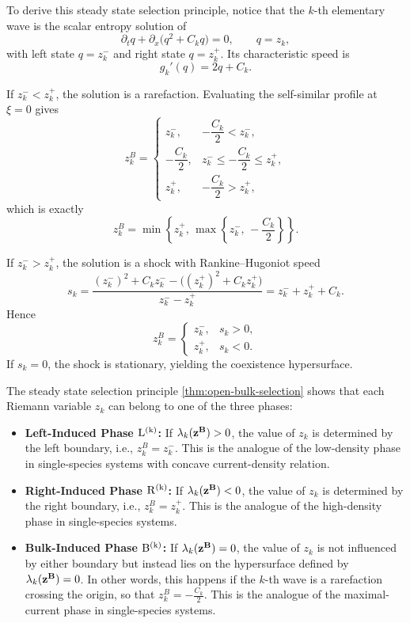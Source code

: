 \documentclass[12pt]{article}
\begin{document}
%
To derive this steady state selection principle, notice that
the $k$-th elementary wave is the scalar entropy solution of
\[
\partial_t q+\partial_x\bigl(q^2+C_k q\bigr)=0,
\qquad q=z_k,
\]
with left state $q=z_k^-$ and right state $q=z_k^+$. Its characteristic
speed is
\[
g_k'(q)=2q+C_k.
\]

If $z_k^-<z_k^+$, the solution is a rarefaction. Evaluating the
self-similar profile at $\xi=0$ gives
\[
z_k^B=
\begin{cases}
z_k^-, & -\dfrac{C_k}{2}<z_k^-,\\[2mm]
-\dfrac{C_k}{2}, & z_k^-\le -\dfrac{C_k}{2}\le z_k^+,\\[3mm]
z_k^+, & -\dfrac{C_k}{2}>z_k^+,
\end{cases}
\]
which is exactly
\[
z_k^B=\min\!\left\{ z_k^+,\, \max\!\left\{ z_k^-,\, -\dfrac{C_k}{2} \right\} \right\}.
\]

If $z_k^->z_k^+$, the solution is a shock with Rankine--Hugoniot speed
\[
s_k=\frac{(z_k^-)^2+C_k z_k^--\bigl((z_k^+)^2+C_k z_k^+\bigr)}{z_k^- - z_k^+}
=z_k^-+z_k^+ + C_k.
\]
Hence
\[
z_k^B=
\begin{cases}
z_k^-, & s_k>0,\\[1mm]
z_k^+, & s_k<0.
\end{cases}
\]
If $s_k=0$, the shock is stationary, yielding the coexistence
hypersurface.


The steady state selection principle \eqref{thm:open-bulk-selection} shows that each Riemann variable
$z_k$ can belong to one of the three phases:
\begin{itemize}
    \item \textbf{Left-Induced Phase  $\rm L^{(k)}$:} If \( \lambda_k({\bf z^B}) > 0 \), the value of \( z_k \) is determined by the left boundary, i.e., \( z_k^B = z_k^{-} \). This is the analogue of the low-density phase in single-species systems with
concave current-density relation.

    \item \textbf{Right-Induced Phase $ \rm R^{(k)}$: } If \( \lambda_k({\bf z^B})  < 0 \), the value of \( z_k \) is determined by the right boundary, i.e., \( z_k^B = z_k^{+} \). 
 This is the analogue of the high-density phase in single-species systems.
    \item \textbf{Bulk-Induced Phase $ \rm B^{(k)}$:} If \( \lambda_k({\bf z^B})  = 0 \), the value of \( z_k \) is not influenced by either boundary but instead lies on the hypersurface defined by \( \lambda_k({\bf z^B}) = 0 \). In other words, this happens if the $k$-th wave is a rarefaction
crossing the origin, so that
$z_k^B=-\frac{C_k}{2}$.
This is the analogue of the maximal-current phase in single-species systems.
\end{itemize}
\end{document}
